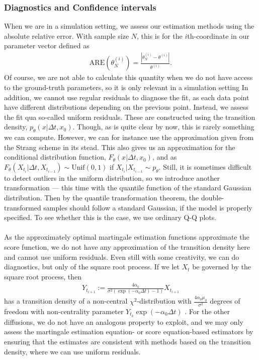 \subsubsection{Diagnostics and Confidence intervals}
When we are in a simulation setting, we assess our estimation methods using the absolute relative error. With sample size $N$, this is for the $i$th-coordinate in our parameter vector defined as
\begin{align}
    \mathrm{ARE}\left(\theta_N^{(i)}\right) = \frac{\left|\theta_N^{(i)} - \theta^{(i)}\right|}{\theta^{(i)}}. \label{eq:ARE}
\end{align}
Of course, we are not able to calculate this quantity when we do not have access to the ground-truth parameters, so it is only relevant in a simulation setting In addition, we cannot use regular residuals to diagnose the fit, as each data point have different distributions depending on the previous point. Instead, we assess the fit qua so-called uniform residuals. These are constructed using the transition density, $p_\theta(x|\Delta t, x_0)$. Though, as is quite clear by now, this is rarely something we can compute. However, we can for instance use the approximation given from the Strang scheme in its stead. This also gives us an approximation for the conditional distribution function, $F_\theta(x|\Delta t, x_0)$, and as $F_\theta(X_{t_{i}}|\Delta t, X_{t_{i - 1}})\sim \mathrm{Unif}(0,1)$ if $X_{t_{i}}|X_{t_{i - 1}} \sim p_\theta$. Still, it is sometimes difficult to detect outliers in the uniform distribution, so we introduce another transformation — this time with the quantile function of the standard Gaussian distribution. Then by the quantile transformation theorem, the double-transformed samples should follow a standard Gaussian, if the model is properly specified. To see whether this is the case, we use ordinary Q-Q plots.\\\\
As the approximately optimal martingale estimation functions approximate the score function, we do not have any approximation of the transition density here and cannot use uniform residuals. Even still with some creativity, we can do diagnostics, but only of the square root process. If we let $X_t$ be governed by the square root process, then
\begin{align}
    Y_{t_{i + 1}} := \frac{4\alpha_0}{\sigma^2\left(\exp\left(-\alpha_0 \Delta t\right) - 1\right)}X_{t_{i + 1}}
\end{align}
has a transition density of a non-central $\chi^2$-distribution with $\frac{4\alpha_0\mu_0}{\sigma^2}$ degrees of freedom with non-centrality parameter $Y_{t_k}\exp\left(-\alpha_0 \Delta t\right)$ \cite[Equation (5.68)]{Srkk2019}. For the other diffusions, we do not have an analogous property to exploit, and we may only assess the martingale estimation equation- or score equation-based estimators by ensuring that the estimates are consistent with methods based on the transition density, where we can use uniform residuals.\\\\
